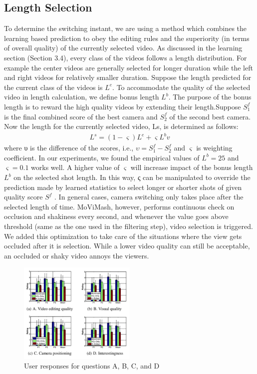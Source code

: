 \documentclass{sig-alternate}
\begin{document}
    \subsection{Length Selection}
    To determine the switching instant, we are using a method which combines the learning based prediction to obey the editing rules and the superiority (in terms of overall quality) of the currently selected video. As discussed in the learning section (Section 3.4), every class of the videos follows a length distribution. For example the center videos are generally selected for longer duration while the left and right videos for relatively smaller duration. Suppose the length predicted for the current class of the videos is $L^e$. To accommodate the quality of the selected video in length calculation, we define bonus length $L^b$. The purpose of the bonus length is to reward the high quality videos by extending their length.Suppose $S^f_1$ is the final combined score of the best camera and $S^f_2$ of the second best camera. Now the length for the currently selected video, Ls, is determined as follows:
    \begin{align}
        L^s = (1- \varsigma )L^e + \varsigma L^bv
    \end{align}
    where υ is the difference of the scores, i.e., $υ =S^f_1 −S^f_2$ and $\varsigma$ is weighting coefficient. In our experiments, we found the empirical values of $L^b = 25$ and $\varsigma = 0.1$ works well. A higher value of $\varsigma$ will increase impact of the bonus length $L^b$ on the selected shot length. In this way, ς can be manipulated to override the prediction made by learned statistics to select longer or shorter shots of given quality score $S^f$ .
    In general cases, camera switching only takes place after the selected length of time. MoViMash, however, performs continuous check on occlusion and shakiness every second, and whenever the value goes above threshold (same as the one used in the filtering step), video selection is triggered. We added this optimization to take care of the situations where the view gets occluded after it is selection. While a lower video quality can still be acceptable, an occluded or shaky video annoys the viewers.

    \begin{figure}[h]
    \centering
    \includegraphics[width=0.5\textwidth]{img7.png}
    \caption{User responses for questions A, B, C, and D}
    \label{fig:mesh7}
\end{figure}
\end{document}

